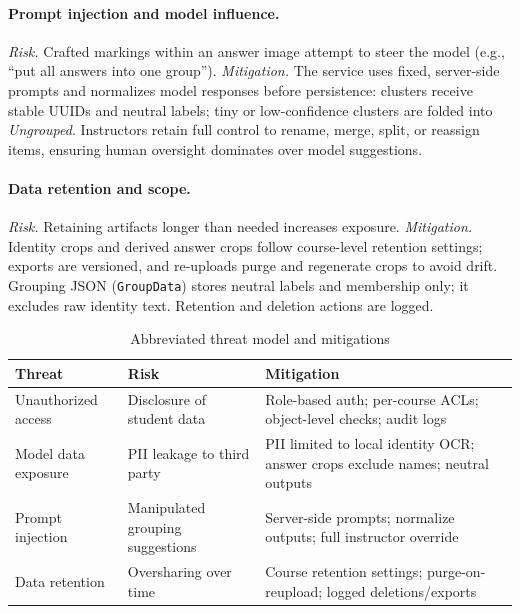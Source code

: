 \documentclass[ms,twoside,print]{nuthesis}
\begin{document}
\paragraph{Prompt injection and model influence.}
\emph{Risk.} Crafted markings within an answer image attempt to steer the model (e.g., \enquote{put all answers into one group}). \emph{Mitigation.} The service uses fixed, server-side prompts and normalizes model responses before persistence: clusters receive stable UUIDs and neutral labels; tiny or low-confidence clusters are folded into \emph{Ungrouped}. Instructors retain full control to rename, merge, split, or reassign items, ensuring human oversight dominates over model suggestions.

\paragraph{Data retention and scope.}
\emph{Risk.} Retaining artifacts longer than needed increases exposure. \emph{Mitigation.} Identity crops and derived answer crops follow course-level retention settings; exports are versioned, and re-uploads purge and regenerate crops to avoid drift. Grouping JSON (\texttt{GroupData}) stores neutral labels and membership only; it excludes raw identity text. Retention and deletion actions are logged.

\begin{table}[H]\centering
\caption{Abbreviated threat model and mitigations}\label{tab:threats}
\begin{tabularx}{\textwidth}{@{}p{3.8cm}Xp{4.6cm}@{}}
\toprule
\textbf{Threat} & \textbf{Risk} & \textbf{Mitigation} \\
\midrule
Unauthorized access & Disclosure of student data & Role-based auth; per-course ACLs; object-level checks; audit logs \\
Model data exposure & PII leakage to third party & PII limited to local identity OCR; answer crops exclude names; neutral outputs \\
Prompt injection & Manipulated grouping suggestions & Server-side prompts; normalize outputs; full instructor override \\
Data retention & Oversharing over time & Course retention settings; purge-on-reupload; logged deletions/exports \\
\bottomrule
\end{tabularx}
\end{table}
\end{document}
